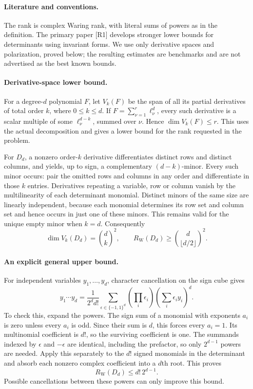 \documentclass[11pt,a4paper]{article}
\begin{document}
\paragraph{Literature and conventions.}
The rank is complex Waring rank, with literal sums of powers as in the
definition. The primary paper [R1] develops stronger lower bounds for
determinants using invariant forms. We use only derivative spaces and
polarization, proved below; the resulting estimates are benchmarks and
are not advertised as the best known bounds.

\paragraph{Derivative-space lower bound.}
For a degree-$d$ polynomial $F$, let $V_k(F)$ be the span of all its
partial derivatives of total order $k$, where $0\le k\le d$.
If $F=\sum_{\nu=1}^r\ell_\nu^d$, every such derivative is a scalar
multiple of some $\ell_\nu^{d-k}$, summed over $\nu$. Hence
$\dim V_k(F)\le r$. This uses the actual decomposition and gives
a lower bound for the rank requested in the problem.

For $D_d$, a nonzero order-$k$ derivative differentiates distinct
rows and distinct columns, and yields, up to sign, a complementary
$(d-k)$-minor. Every such minor occurs: pair the omitted rows and
columns in any order and differentiate in those $k$ entries.
Derivatives repeating a variable, row or column vanish by the
multilinearity of each determinant monomial. Distinct minors of the
same size are linearly independent, because each monomial determines
its row set and column set and hence occurs in just one of these minors.
This remains valid for the unique empty minor when $k=d$.
Consequently
\[
 \dim V_k(D_d)=\binom dk^2,\qquad
 R_{\mathrm W}(D_d)\ge\binom d{\lfloor d/2\rfloor}^{\!2}.
\]

\paragraph{An explicit general upper bound.}
For independent variables $y_1,\ldots,y_d$, character cancellation on
the sign cube gives
\[
 y_1\cdots y_d=
 \frac{1}{2^d d!}\sum_{\epsilon\in\{-1,1\}^d}
 \left(\prod_i\epsilon_i\right)
 \left(\sum_i\epsilon_i y_i\right)^d.
\]
To check this, expand the powers. The sign sum of a monomial with
exponents $a_i$ is zero unless every $a_i$ is odd. Since their sum
is $d$, this forces every $a_i=1$. Its multinomial coefficient is
$d!$, so the surviving coefficient is one. The summands indexed by
$\epsilon$ and $-\epsilon$ are identical, including the prefactor,
so only $2^{d-1}$ powers are needed. Apply this separately to the
$d!$ signed monomials in the determinant and absorb each nonzero
complex coefficient into a $d$th root. This proves
\[
 R_{\mathrm W}(D_d)\le d!\,2^{d-1}.
\]
Possible cancellations between these powers can only improve this bound.
\end{document}
